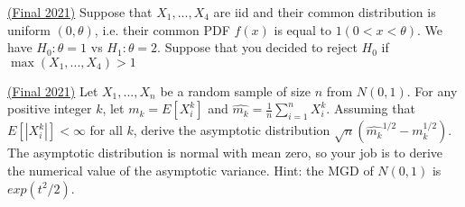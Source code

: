 \documentclass[answers]{exam}
\begin{document}
\begin{questions}
\question \href{https://drive.google.com/drive/folders/1f3rKaHYUMvUB4_RBHUFTtTVIzO9osoP4}{(Final 2021)} Suppose that $X_1,...,X_4$ are iid and their common distribution is uniform $(0,\theta)$, i.e. their common PDF $f(x)$ is equal to $1(0<x<\theta)$. We have $H_0: \theta = 1$ vs $H_1 : \theta = 2$. Suppose that you decided to reject $H_0$ if $\max(X_1,...,X_4)>1$

\question \href{https://drive.google.com/drive/folders/1f3rKaHYUMvUB4_RBHUFTtTVIzO9osoP4}{(Final 2021)} Let $X_1,...,X_n$ be a random sample of size $n$ from $N(0,1)$. For any positive integer $k$, let $m_k = E[X_i^k]$ and $\hat{m_k} = \frac{1}{n} \sum_{i=1}^n X_i^k$. Assuming that $E[|X_i^k|] < \infty$ for all $k$, derive the asymptotic distribution $\sqrt{n}(\hat{m_k}^{1/2} - m_k^{1/2})$. The asymptotic distribution is normal with mean zero, so your job is to derive the numerical value of the asymptotic variance. Hint: the MGD of $N(0,1)$ is $exp(t^2/2)$.
\begin{solution}
\end{solution}


\end{questions}
\end{document}
